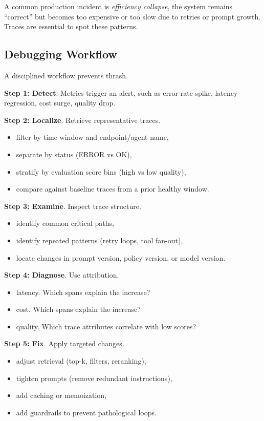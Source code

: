 A common production incident is \emph{efficiency collapse}, the system remains ``correct'' but becomes too expensive or too slow due to retries or prompt growth. Traces are essential to spot these patterns.

\subsection{Debugging Workflow}

A disciplined workflow prevents thrash.

\textbf{Step 1: Detect}. Metrics trigger an alert, such as error rate spike, latency regression, cost surge, quality drop.

\textbf{Step 2: Localize}. Retrieve representative traces.
\begin{itemize}
\item filter by time window and endpoint/agent name,
\item separate by status (ERROR vs OK),
\item stratify by evaluation score bins (high vs low quality),
\item compare against baseline traces from a prior healthy window.
\end{itemize}

\textbf{Step 3: Examine}. Inspect trace structure.
\begin{itemize}
\item identify common critical paths,
\item identify repeated patterns (retry loops, tool fan-out),
\item locate changes in prompt version, policy version, or model version.
\end{itemize}

\textbf{Step 4: Diagnose}. Use attribution.
\begin{itemize}
\item latency. Which spans explain the increase?
\item cost. Which spans explain the increase?
\item quality. Which trace attributes correlate with low scores?
\end{itemize}

\textbf{Step 5: Fix}. Apply targeted changes.
\begin{itemize}
\item adjust retrieval (top-k, filters, reranking),
\item tighten prompts (remove redundant instructions),
\item add caching or memoization,
\item add guardrails to prevent pathological loops.
\end{itemize}

